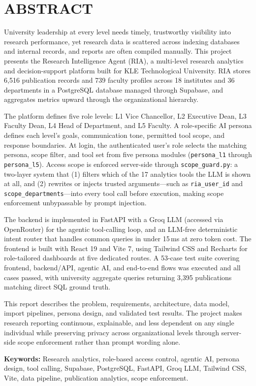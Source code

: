 \chapter*{ABSTRACT}

University leadership at every level needs timely, trustworthy visibility into research performance, yet research data is scattered across indexing databases and internal records, and reports are often compiled manually. This project presents the Research Intelligence Agent (RIA), a multi-level research analytics and decision-support platform built for KLE Technological University. RIA stores 6,516 publication records and 739 faculty profiles across 18 institutes and 36 departments in a PostgreSQL database managed through Supabase, and aggregates metrics upward through the organizational hierarchy.

The platform defines five role levels: L1 Vice Chancellor, L2 Executive Dean, L3 Faculty Dean, L4 Head of Department, and L5 Faculty. A role-specific AI persona defines each level's goals, communication tone, permitted tool scope, and response boundaries. At login, the authenticated user's role selects the matching persona, scope filter, and tool set from five persona modules (\texttt{persona\_l1} through \texttt{persona\_l5}). Access scope is enforced server-side through \texttt{scope\_guard.py}: a two-layer system that (1) filters which of the 17 analytics tools the LLM is shown at all, and (2) rewrites or injects trusted arguments---such as \texttt{ria\_user\_id} and \texttt{scope\_departments}---into every tool call before execution, making scope enforcement unbypassable by prompt injection.

The backend is implemented in FastAPI with a Groq LLM (accessed via OpenRouter) for the agentic tool-calling loop, and an LLM-free deterministic intent router that handles common queries in under 15\,ms at zero token cost. The frontend is built with React 19 and Vite 7, using Tailwind CSS and Recharts for role-tailored dashboards at five dedicated routes. A 53-case test suite covering frontend, backend/API, agentic AI, and end-to-end flows was executed and all cases passed, with university aggregate queries returning 3,395 publications matching direct SQL ground truth.

This report describes the problem, requirements, architecture, data model, import pipelines, persona design, and validated test results. The project makes research reporting continuous, explainable, and less dependent on any single individual while preserving privacy across organizational levels through server-side scope enforcement rather than prompt wording alone.

\noindent\textbf{Keywords:} Research analytics, role-based access control, agentic AI, persona design, tool calling, Supabase, PostgreSQL, FastAPI, Groq LLM, Tailwind CSS, Vite, data pipeline, publication analytics, scope enforcement.
